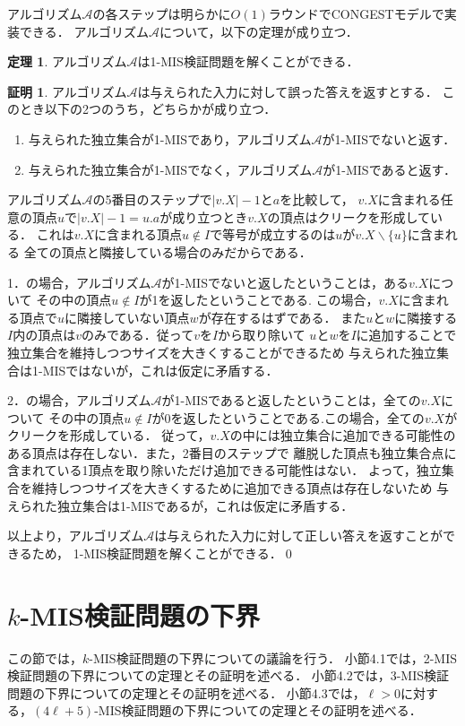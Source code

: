 \documentclass[11pt,a4paper]{jarticle}
\newcommand{\CONGEST}{\textsf{CONGEST}}
\theoremstyle{definition}
\newtheorem{theorem}{定理}[section]
\newtheorem*{prf*}{証明}
\begin{document}
アルゴリズム$\mathcal{A}$の各ステップは明らかに$O(1)$ラウンドで{\CONGEST}モデルで実装できる．
アルゴリズム$\mathcal{A}$について，以下の定理が成り立つ．
\begin{theorem}
アルゴリズム$\mathcal{A}$は1-MIS検証問題を解くことができる．
\end{theorem}
\begin{prf*}
アルゴリズム$\mathcal{A}$は与えられた入力に対して誤った答えを返すとする．
このとき以下の2つのうち，どちらかが成り立つ． 
\begin{enumerate}
\item 与えられた独立集合が1-MISであり，アルゴリズム$\mathcal{A}$が1-MISでないと返す． 
\item 与えられた独立集合が1-MISでなく，アルゴリズム$\mathcal{A}$が1-MISであると返す． 
\end{enumerate}
アルゴリズム$\mathcal{A}$の5番目のステップで$|v.X| - 1$と$a$を比較して，
$v.X$に含まれる任意の頂点$u$で$|v.X| - 1 = u.a$が成り立つとき$v.X$の頂点はクリークを形成している．
これは$v.X$に含まれる頂点$u \notin I$で等号が成立するのは$u$が$v.X \backslash \{u\}$に含まれる
全ての頂点と隣接している場合のみだからである．

1．の場合，アルゴリズム$\mathcal{A}$が1-MISでないと返したということは，ある$v.X$について
その中の頂点$u \notin I$が1を返したということである.
この場合，$v.X$に含まれる頂点で$u$に隣接していない頂点$w$が存在するはずである．
また$u$と$w$に隣接する$I$内の頂点は$v$のみである．従って$v$を$I$から取り除いて
$u$と$w$を$I$に追加することで独立集合を維持しつつサイズを大きくすることができるため
与えられた独立集合は1-MISではないが，これは仮定に矛盾する． 

2．の場合，アルゴリズム$\mathcal{A}$が1-MISであると返したということは，全ての$v.X$について
その中の頂点$u \notin I$が0を返したということである.この場合，全ての$v.X$がクリークを形成している．
従って，$v.X$の中には独立集合に追加できる可能性のある頂点は存在しない．また，2番目のステップで
離脱した頂点も独立集合点に含まれている1頂点を取り除いただけ追加できる可能性はない．
よって，独立集合を維持しつつサイズを大きくするために追加できる頂点は存在しないため
与えられた独立集合は1-MISであるが，これは仮定に矛盾する． 

以上より，アルゴリズム$\mathcal{A}$は与えられた入力に対して正しい答えを返すことができるため，
1-MIS検証問題を解くことができる．\qed
\end{prf*}
\newpage

\section{$k$-MIS検証問題の下界}
この節では，$k$-MIS検証問題の下界についての議論を行う．
小節4.1では，2-MIS検証問題の下界についての定理とその証明を述べる．
小節4.2では，3-MIS検証問題の下界についての定理とその証明を述べる．
小節4.3では，$\ell > 0$に対する，$(4\ell + 5)$-MIS検証問題の下界についての定理とその証明を述べる．
\end{document}
